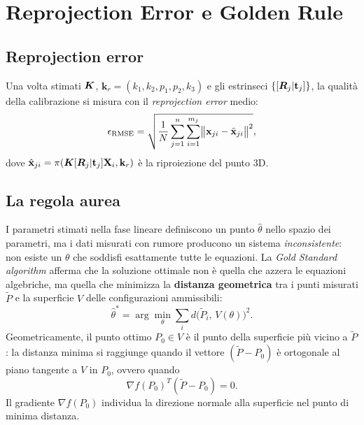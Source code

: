 \section{Reprojection Error e Golden Rule}
\label{sec:golden_rule}

\subsection{Reprojection error}
\label{sub:reproj}

Una volta stimati \(\boldsymbol{K}\), \(\mathbf{k}_r=(k_1,k_2,p_1,p_2,k_3)\)
e gli estrinseci \(\{[\boldsymbol{R}_j|\mathbf{t}_j]\}\), la qualità della
calibrazione si misura con il \emph{reprojection error} medio:
\[
  \epsilon_{\mathrm{RMSE}}
  =\sqrt{\frac{1}{N}\sum_{j=1}^{n}\sum_{i=1}^{m_j}
          \bigl\|\mathbf{x}_{ji}-\hat{\mathbf{x}}_{ji}\bigr\|^2},
\]
dove \(\hat{\mathbf{x}}_{ji}=\pi\!\left(\boldsymbol{K}[\boldsymbol{R}_j|\mathbf{t}_j]
\mathbf{X}_i,\mathbf{k}_r\right)\) è la riproiezione del punto 3D.

\subsection{La regola aurea}
\label{sub:golden_rule}

I parametri stimati nella fase lineare definiscono un punto
\(\hat\theta\) nello spazio dei parametri, ma i dati misurati con
rumore producono un sistema \emph{inconsistente}: non esiste un
\(\theta\) che soddisfi esattamente tutte le equazioni.
La \emph{Gold Standard algorithm} afferma che la soluzione ottimale non
è quella che azzera le equazioni algebriche, ma quella che minimizza la
\textbf{distanza geometrica} tra i punti misurati \(\tilde{P}\) e la
superficie \(V\) delle configurazioni ammissibili:
\[
  \hat{\theta}^* = \arg\min_{\theta}\sum_i
  d\!\bigl(\tilde{P}_i,\,V(\theta)\bigr)^2.
\]
Geometricamente, il punto ottimo \(P_0\in V\) è il punto della
superficie più vicino a \(\tilde{P}\): la distanza minima si raggiunge
quando il vettore \((\tilde{P}-P_0)\) è ortogonale al piano tangente
a \(V\) in \(P_0\), ovvero quando
\[
  \nabla f(P_0)^T(\tilde{P}-P_0) = 0.
\]
Il gradiente \(\nabla f(P_0)\) individua la direzione normale alla
superficie nel punto di minima distanza.

